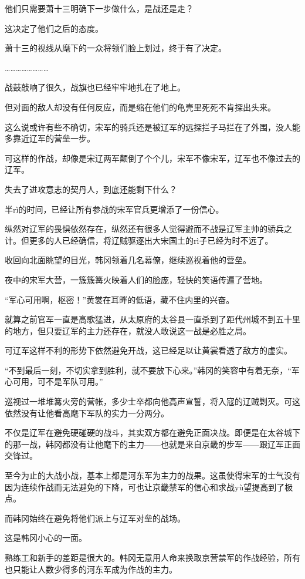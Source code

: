 他们只需要萧十三明确下一步做什么，是战还是走？

这决定了他们之后的态度。

萧十三的视线从麾下的一众将领们脸上划过，终于有了决定。

……………………

战鼓敲响了很久，战旗也已经牢牢地扎在了地上。

但对面的敌人却没有任何反应，而是缩在他们的龟壳里死死不肯探出头来。

这么说或许有些不确切，宋军的骑兵还是被辽军的远探拦子马拦在了外围，没人能多靠近辽军的营垒一步。

可这样的作战，却像是宋辽两军颠倒了个个儿，宋军不像宋军，辽军也不像过去的辽军。

失去了进攻意志的契丹人，到底还能剩下什么？

半rì的时间，已经让所有参战的宋军官兵更增添了一份信心。

纵然对辽军的畏惧依然存在，纵然还有很多人觉得避而不战是辽军主帅的骄兵之计。但更多的人已经确信，将辽贼驱逐出大宋国土的rì子已经为时不远了。

收回向北面眺望的目光，韩冈领着几名幕僚，继续巡视着他的营垒。

夜中的宋军大营，一簇簇篝火映着人们的脸庞，轻快的笑语传遍了营地。

“军心可用啊，枢密！”黄裳在耳畔的低语，藏不住内里的兴奋。

就算之前官军一直是高歌猛进，从太原府的太谷县一直杀到了距代州城不到五十里的地方，但只要辽军的主力还存在，就没人敢说这一战是必胜之局。

可辽军这样不利的形势下依然避免开战，这已经足以让黄裳看透了敌方的虚实。

“不到最后一刻，不切实拿到胜利，就不要放下心来。”韩冈的笑容中有着无奈，“军心可用，可不是军队可用。”

巡视过一堆堆篝火旁的营帐，多少士卒都向他高声宣誓，将入寇的辽贼剿灭。可这依然没有让他看高麾下军队的实力一分两分。

不仅是辽军在避免硬碰硬的战斗，其实双方都在避免正面决战。即便是在太谷城下的那一战，韩冈都没有让他麾下的主力——也就是来自京畿的步军——跟辽军正面交锋过。

至今为止的大战小战，基本上都是河东军为主力的战果。这虽使得宋军的士气没有因为连续作战而无法避免的下降，可也让京畿禁军的信心和求战yù望提高到了极点。

而韩冈始终在避免将他们派上与辽军对垒的战场。

这是韩冈小心的一面。

熟练工和新手的差距是很大的。韩冈无意用人命来换取京营禁军的作战经验，所有也只能让人数少得多的河东军成为作战的主力。

